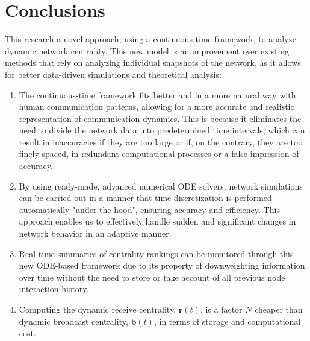 
\chapter{Conclusions}
\label{chap:concl}

This research  a novel approach, using a continuous-time framework, to analyze dynamic network centrality. This new model is an improvement over existing methods that rely on analyzing individual snapshots of the network, as it allows for better data-driven simulations and theoretical analysis:

\begin{enumerate}[label=(\roman*)]
  \item The continuous-time framework fits better and in a more natural way with human communication patterns, allowing for a more accurate and realistic representation of communication dynamics. This is because it eliminates the need to divide the network data into predetermined time intervals, which can result in inaccuracies if they are too large or if, on the contrary, they are too finely spaced, in redundant computational processes or a false impression of accuracy.
  \item By using ready-made, advanced numerical ODE solvers, network simulations can be carried out in a manner that time discretization is performed automatically "under the hood", ensuring   accuracy and efficiency. This approach enables us to effectively handle sudden and significant changes in network behavior in an adaptive manner.
  \item Real-time summaries of centrality rankings can be monitored through this new ODE-based framework due to its property of downweighting information over time without the need to store or take account of all previous node interaction history.
  \item Computing the dynamic receive centrality, $\mathbf{r}(t)$, is a factor $N$ cheaper than dynamic broadcast centrality, $\mathbf{b}(t)$, in terms of storage and computational cost.
\end{enumerate}







